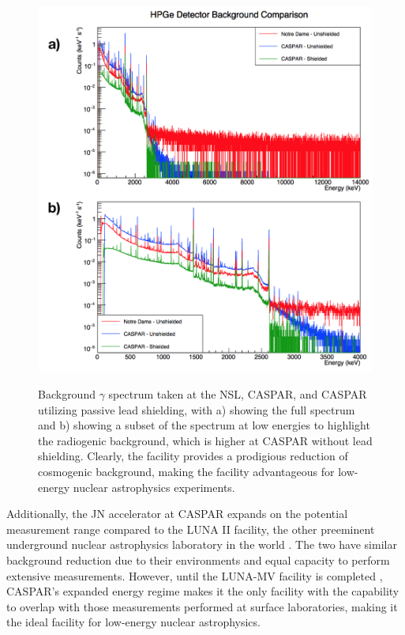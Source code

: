 \begin{figure}
\centering
\includegraphics[width=\linewidth]{figures/casparBackgrounds.png}
\label{fig: backgroundComparison}
\caption{Background $\gamma$ spectrum taken at the NSL, CASPAR, and CASPAR utilizing passive lead shielding, with a) showing the full spectrum and b) showing a subset of the spectrum at low energies to highlight the radiogenic background, which is higher at CASPAR without lead shielding. Clearly, the facility provides a prodigious reduction of cosmogenic background, making the facility advantageous for low-energy nuclear astrophysics experiments.}
\end{figure}



Additionally, the JN accelerator at CASPAR expands on the potential measurement range compared to the LUNA II facility, the other preeminent underground nuclear astrophysics laboratory in the world \cite{Formicola2003a}. The two have similar background reduction due to their environments and equal capacity to perform extensive measurements. However, until the LUNA-MV facility is completed \cite{Broggini2010, Ferraro2018}, CASPAR's expanded energy regime makes it the only facility with the capability to overlap with those measurements performed at surface laboratories, making it the ideal facility for low-energy nuclear astrophysics. 

